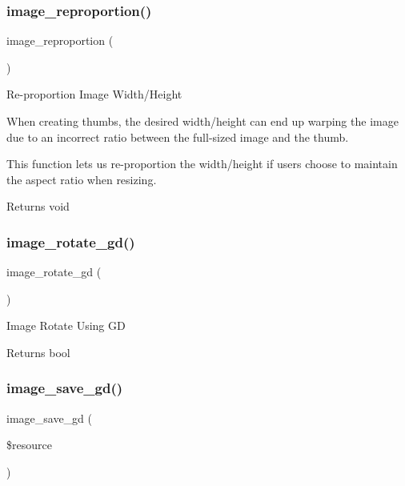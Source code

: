 \subsubsection{\texorpdfstring{image\+\_\+reproportion()}{image\_reproportion()}}
{\footnotesize\ttfamily image\+\_\+reproportion (\begin{DoxyParamCaption}{ }\end{DoxyParamCaption})}

Re-\/proportion Image Width/\+Height

When creating thumbs, the desired width/height can end up warping the image due to an incorrect ratio between the full-\/sized image and the thumb.

This function lets us re-\/proportion the width/height if users choose to maintain the aspect ratio when resizing.

\begin{DoxyReturn}{Returns}
void 
\end{DoxyReturn}
\mbox{\label{class_c_i___image__lib_ae0d52ef7503342a0a1c56c99da140446}} 
\subsubsection{\texorpdfstring{image\+\_\+rotate\+\_\+gd()}{image\_rotate\_gd()}}
{\footnotesize\ttfamily image\+\_\+rotate\+\_\+gd (\begin{DoxyParamCaption}{ }\end{DoxyParamCaption})}

Image Rotate Using GD

\begin{DoxyReturn}{Returns}
bool 
\end{DoxyReturn}
\mbox{\label{class_c_i___image__lib_a802a33d51249d4d31d59cbc89fbc4dd5}} 
\subsubsection{\texorpdfstring{image\+\_\+save\+\_\+gd()}{image\_save\_gd()}}
{\footnotesize\ttfamily image\+\_\+save\+\_\+gd (\begin{DoxyParamCaption}\item[{}]{\$resource }\end{DoxyParamCaption})}

